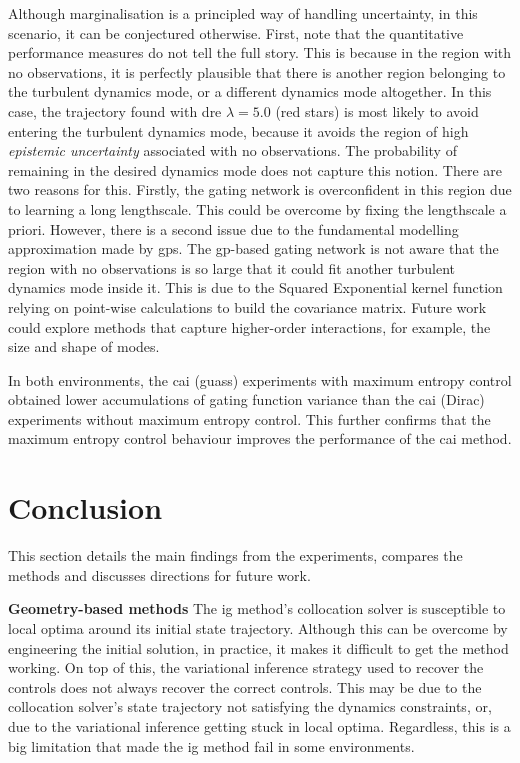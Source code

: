 \documentclass{mimosis-class/mimosis}
\numberwithin{equation}{chapter}
\begin{document}
{Although marginalisation is a principled way of handling uncertainty, in this scenario,
it can be conjectured otherwise.
First, note that the quantitative performance measures do not tell the full story.
This is because in the region with no observations, it is perfectly plausible that there
is another region belonging to the turbulent dynamics mode, or a different dynamics mode altogether.
In this case, the trajectory found with \acrshort{dre} \(\lambda=5.0\) (red stars) is most likely to
avoid entering the turbulent dynamics mode, because it avoids the region of
high \emph{epistemic uncertainty} associated with no observations.
The probability of remaining in the desired dynamics mode does not capture this notion.
There are two reasons for this.
Firstly, the gating network is overconfident in this region due to learning a long lengthscale.
This could be overcome by fixing the lengthscale a priori.
However, there is a second issue due to the fundamental modelling approximation made by \acrshort{gps}.
The \acrshort{gp}-based gating network is not aware that the region with no observations is so large that it could fit
another turbulent dynamics mode inside it.
This is due to the Squared Exponential kernel function relying on point-wise calculations to build the covariance
matrix.
Future work could explore methods that capture higher-order interactions, for example, the size and shape of
modes.

In both environments, the \acrshort{cai} (guass) experiments with maximum entropy control obtained lower
accumulations of gating function variance than the \acrshort{cai} (Dirac) experiments without maximum entropy control.
This further confirms that the maximum entropy control behaviour improves the performance of the \acrshort{cai}
method.

\section{Conclusion}
\label{sec:org3219b1d}
This section details the main findings from the experiments, compares the methods
and discusses directions for future work.

\textbf{Geometry-based methods}
The \acrshort{ig} method's collocation solver is susceptible to local optima around
its initial state trajectory.
Although this can be overcome by engineering the initial solution, in practice, it makes it difficult to
get the method working.
On top of this, the variational inference strategy used to recover the controls does not always recover the correct controls.
This may be due to the collocation solver's state trajectory not satisfying the dynamics constraints, or,
due to the variational inference getting stuck in local optima.
Regardless, this is a big limitation that made the \acrshort{ig} method fail in some environments.

}
\end{document}
